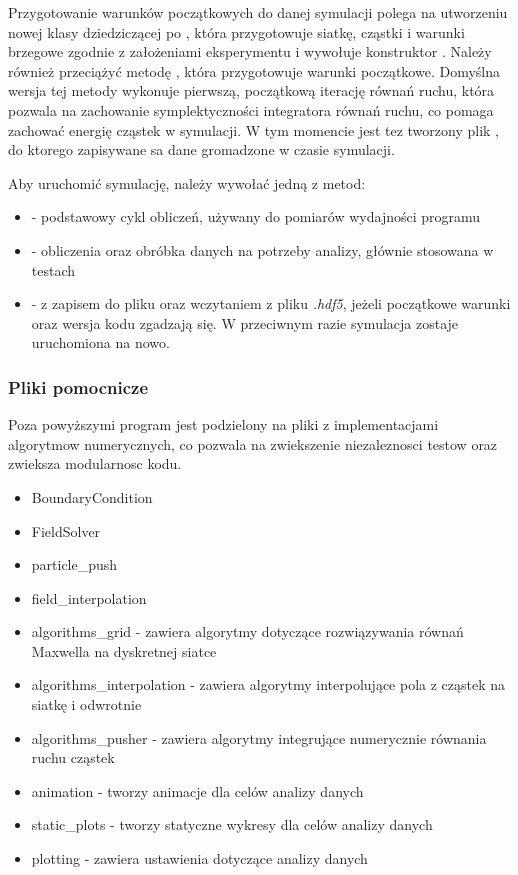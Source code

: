Przygotowanie warunków początkowych do danej symulacji polega na utworzeniu
nowej klasy dziedziczącej po , która przygotowuje siatkę,
cząstki i warunki brzegowe zgodnie z założeniami eksperymentu i wywołuje
konstruktor .  Należy również przeciążyć metodę
, która przygotowuje warunki początkowe. Domyślna
wersja tej metody wykonuje pierwszą, początkową iterację równań ruchu,
która pozwala na zachowanie symplektyczności integratora równań ruchu,
 co pomaga zachować energię cząstek w symulacji.
W tym momencie jest tez tworzony plik , do ktorego zapisywane sa
dane gromadzone w czasie symulacji.

Aby uruchomić symulację, należy wywołać jedną z metod:
\begin{itemize}
     \item {} - podstawowy cykl obliczeń, używany do pomiarów
         wydajności programu
     \item {} - obliczenia oraz obróbka danych na potrzeby
         analizy, głównie stosowana w testach
     \item {} -  z zapisem do pliku oraz
         wczytaniem z pliku \emph{.hdf5}, jeżeli początkowe warunki oraz
         wersja kodu zgadzają się. W przeciwnym razie symulacja zostaje
         uruchomiona na nowo.
\end{itemize}

\subsubsection{Pliki pomocnicze}
Poza powyższymi program jest podzielony na pliki z implementacjami algorytmow numerycznych,
co pozwala na zwiekszenie niezaleznosci testow oraz zwieksza modularnosc kodu. 
\begin{itemize}
    \item BoundaryCondition
    \item FieldSolver
    \item particle\_push
    \item field\_interpolation
    
    \item algorithms\_grid - zawiera algorytmy dotyczące rozwiązywania
        równań Maxwella na dyskretnej siatce
    
    \item algorithms\_interpolation - zawiera algorytmy interpolujące pola
        z cząstek na siatkę i odwrotnie
    \item algorithms\_pusher - zawiera algorytmy integrujące numerycznie
        równania ruchu cząstek
    \item animation - tworzy animacje dla celów analizy danych
    \item static\_plots - tworzy statyczne wykresy dla celów analizy danych
    \item plotting - zawiera ustawienia dotyczące analizy danych
\end{itemize}

